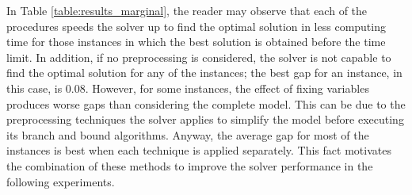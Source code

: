 \documentclass[a4paper,  review, authoryear, 1p.]{elsarticle}
\newcommand{\JP}[1]{{\color{armygreen}#1}}
\begin{document}
{%
\begin{table}[htbp]
	\centering
	\caption{Computational results \JP{for assessing the usefulness of different strenghthenings}}
	\label{table:results_marginal}%
\end{table}%



In Table \ref{table:results_marginal}, the reader may observe that each of the procedures speeds the solver up to find the optimal solution in less computing time for those instances in which the best solution is obtained before the time limit. In addition, if no preprocessing is considered, the solver is not capable to find the optimal solution for any of the instances; the best gap for an instance, in this case, is 0.08. However, for some instances, the effect of fixing variables produces worse gaps than considering the complete model. This can be due to the preprocessing techniques the solver applies to simplify the model before executing its branch and bound algorithms. Anyway, the average gap 
for most of the instances is best when each technique is applied separately. This fact motivates the combination of these methods to improve the solver performance in the following experiments. }
\end{document}
